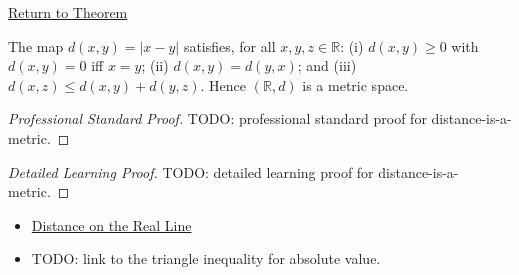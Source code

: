 \newpage
{}
\label{prf:distance-is-a-metric}

\begin{remark*}[Return]
\hyperref[thm:distance-is-a-metric]{Return to Theorem}
\end{remark*}

\begin{theorem*}
The map $d(x,y)=|x-y|$ satisfies, for all $x,y,z\in\mathbb{R}$: (i) $d(x,y)\ge 0$ with $d(x,y)=0$ iff $x=y$; (ii) $d(x,y)=d(y,x)$; and (iii) $d(x,z)\le d(x,y)+d(y,z)$. Hence $(\mathbb{R},d)$ is a metric space.
\end{theorem*}

\begin{proof}[Professional Standard Proof]
\LRAProofBodyStart
TODO: professional standard proof for distance-is-a-metric.
\end{proof}

\begin{proof}[Detailed Learning Proof]
\LRAProofBodyStart
TODO: detailed learning proof for distance-is-a-metric.
\end{proof}

\begin{remark*}
\end{remark*}

\begin{dependencies}
\begin{itemize}
  \item \hyperref[def:distance-on-real-line]{Distance on the Real Line}
  \item TODO: link to the triangle inequality for absolute value.
\end{itemize}
\end{dependencies}

\clearpage
